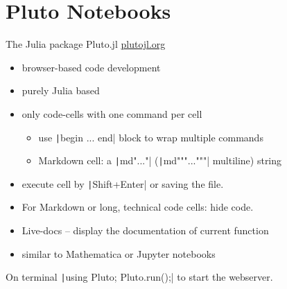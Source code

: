 \documentclass[aspectratio=169, 11pt, handout]{beamer}
\begin{document}
    \section{Pluto Notebooks}
    \begin{frame}[fragile]{The Julia package Pluto.jl}
        \hfill\href{https://plutojl.org}{plutojl.org}
        \begin{itemize}
            \item browser-based code development
            \item purely Julia based
            \pause
            \item only code-cells with \alert{one} command per cell
            \begin{itemize}
                \item use \texttt|begin ... end| block to wrap multiple commands
                \item Markdown cell: a \texttt|md"..."| (\texttt|md"""..."""| multiline) string
            \end{itemize}
            \item execute cell by \texttt|Shift+Enter| or saving the file.
            \pause
            \item For Markdown or long, technical code cells: hide code.
            \pause
            \item Live-docs – display the documentation of current function
            \pause
            \item similar to Mathematica or Jupyter notebooks
        \end{itemize}
        On terminal \texttt|using Pluto; Pluto.run();| to start the webserver.
    \end{frame}
\end{document}
